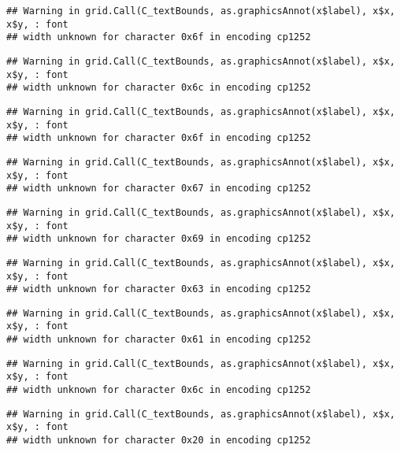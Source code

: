 \documentclass[
]{article}
\begin{document}
\begin{verbatim}
## Warning in grid.Call(C_textBounds, as.graphicsAnnot(x$label), x$x, x$y, : font
## width unknown for character 0x6f in encoding cp1252
\end{verbatim}

\begin{verbatim}
## Warning in grid.Call(C_textBounds, as.graphicsAnnot(x$label), x$x, x$y, : font
## width unknown for character 0x6c in encoding cp1252
\end{verbatim}

\begin{verbatim}
## Warning in grid.Call(C_textBounds, as.graphicsAnnot(x$label), x$x, x$y, : font
## width unknown for character 0x6f in encoding cp1252
\end{verbatim}

\begin{verbatim}
## Warning in grid.Call(C_textBounds, as.graphicsAnnot(x$label), x$x, x$y, : font
## width unknown for character 0x67 in encoding cp1252
\end{verbatim}

\begin{verbatim}
## Warning in grid.Call(C_textBounds, as.graphicsAnnot(x$label), x$x, x$y, : font
## width unknown for character 0x69 in encoding cp1252
\end{verbatim}

\begin{verbatim}
## Warning in grid.Call(C_textBounds, as.graphicsAnnot(x$label), x$x, x$y, : font
## width unknown for character 0x63 in encoding cp1252
\end{verbatim}

\begin{verbatim}
## Warning in grid.Call(C_textBounds, as.graphicsAnnot(x$label), x$x, x$y, : font
## width unknown for character 0x61 in encoding cp1252
\end{verbatim}

\begin{verbatim}
## Warning in grid.Call(C_textBounds, as.graphicsAnnot(x$label), x$x, x$y, : font
## width unknown for character 0x6c in encoding cp1252
\end{verbatim}

\begin{verbatim}
## Warning in grid.Call(C_textBounds, as.graphicsAnnot(x$label), x$x, x$y, : font
## width unknown for character 0x20 in encoding cp1252
\end{verbatim}
\end{document}
